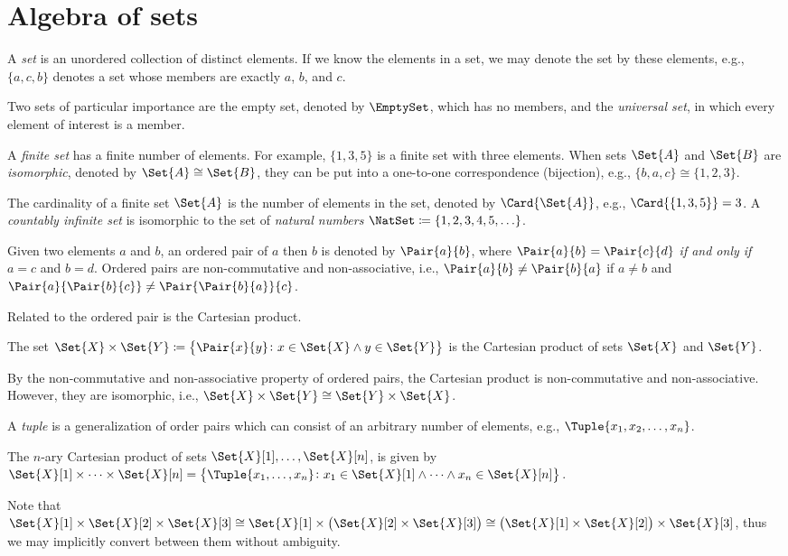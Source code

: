 \documentclass[../main.tex]{subfiles}
\begin{document}
\section{Algebra of sets} 
\label{sec:setalgebra}
A \emph{set} is an unordered collection of distinct elements.
If we know the elements in a set, we may denote the set by these elements, e.g., $\{a,c,b\}$ denotes a set whose members are exactly $a$, $b$, and $c$.

Two sets of particular importance are the empty set, denoted by $\EmptySet$, which has no members, and the \emph{universal set}, in which every element of interest is a member.

A \emph{finite set} has a finite number of elements.
For example, $\{ 1, 3, 5 \}$ is a finite set with three elements.
When sets $\Set{A}$ and $\Set{B}$ are \emph{isomorphic}, denoted by $\Set{A} 
\cong \Set{B}$, they can be put into a one-to-one correspondence (bijection), e.g., $\{b,a,c\} \cong \{1,2,3\}$.

The cardinality of a finite set $\Set{A}$ is the number of elements in the set, denoted by $\Card{\Set{A}}$, e.g., $\Card{\left\{ 1, 3, 5\right\}} = 3$.
A \emph{countably infinite set} is isomorphic to the set of \emph{natural numbers} $\NatSet \coloneqq \{1,2,3,4,5,\ldots\}$.


Given two elements $a$ and $b$, an ordered pair of $a$ then $b$ is denoted by $\Pair{a}{b}$, where $\Pair{a}{b} = \Pair{c}{d}$ \emph{if and only if} $a = c$ and $b = d$.
Ordered pairs are non-commutative and non-associative, i.e., $\Pair{a}{b} \neq \Pair{b}{a}$ if $a \neq b$ and $\Pair{a}{\Pair{b}{c}} \neq \Pair{\Pair{b}{a}}{c}$.

Related to the ordered pair is the Cartesian product.
\begin{definition}
	The set $\Set{X} \times \Set{Y} \coloneqq \left\{\Pair{x}{y} \colon x \in 
	\Set{X} \land y \in \Set{Y}\right\}$ is the Cartesian product of sets $\Set{X}$ 
	and $\Set{Y}$.
\end{definition}
By the non-commutative and non-associative property of ordered pairs, the Cartesian product is non-commutative and non-associative.
However, they are isomorphic, i.e., $\Set{X} \times \Set{Y} \cong \Set{Y} \times \Set{X}$.

A \emph{tuple} is a generalization of order pairs which can consist of an arbitrary number of elements, e.g., $\Tuple{x_1,x_2,\ldots,x_n}$.
\begin{definition}
	The $n$-ary Cartesian product of sets $\Set{X}[1],\ldots,\Set{X}[n]$, is given by $\Set{X}[1] \times \cdots \times \Set{X}[n] = \left\{\Tuple{x_1,\ldots,x_n} \colon x_1 \in \Set{X}[1] \land \cdots \land x_n \in \Set{X}[n]\right\}$.
\end{definition}
Note that
	$\Set{X}[1] \times \Set{X}[2] \times \Set{X}[3] \cong \Set{X}[1] \times \left(\Set{X}[2] \times \Set{X}[3]\right) \cong \left(\Set{X}[1] \times \Set{X}[2]\right) \times \Set{X}[3]$,
thus we may implicitly convert between them without ambiguity.
\end{document}
